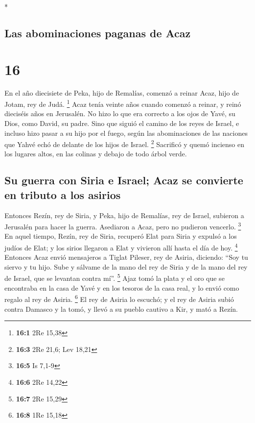 \begin{paracol}{2}
\begin{otherlanguage}{english}
\end{otherlanguage}

\switchcolumn[0]*

\hypertarget{las-abominaciones-paganas-de-acaz}{%
\subsection{Las abominaciones paganas de
Acaz}\label{las-abominaciones-paganas-de-acaz}}

\hypertarget{section-30}{%
\section{16}\label{section-30}}

 En el año diecisiete de Peka, hijo de Remalías, comenzó a
reinar Acaz, hijo de Jotam, rey de Judá. \footnote{\textbf{16:1} 2Re
  15,38}  Acaz tenía veinte años cuando comenzó a reinar,
y reinó dieciséis años en Jerusalén. No hizo lo que era correcto a los
ojos de Yavé, su Dios, como David, su padre.  Sino que
siguió el camino de los reyes de Israel, e incluso hizo pasar a su hijo
por el fuego, según las abominaciones de las naciones que Yahvé echó de
delante de los hijos de Israel. \footnote{\textbf{16:3} 2Re 21,6; Lev
  18,21}  Sacrificó y quemó incienso en los lugares altos,
en las colinas y debajo de todo árbol verde.

\hypertarget{su-guerra-con-siria-e-israel-acaz-se-convierte-en-tributo-a-los-asirios}{%
\subsection{Su guerra con Siria e Israel; Acaz se convierte en tributo a
los
asirios}\label{su-guerra-con-siria-e-israel-acaz-se-convierte-en-tributo-a-los-asirios}}

 Entonces Rezín, rey de Siria, y Peka, hijo de Remalías,
rey de Israel, subieron a Jerusalén para hacer la guerra. Asediaron a
Acaz, pero no pudieron vencerlo. \footnote{\textbf{16:5} Is 7,1-9}
 En aquel tiempo, Rezín, rey de Siria, recuperó Elat para
Siria y expulsó a los judíos de Elat; y los sirios llegaron a Elat y
vivieron allí hasta el día de hoy. \footnote{\textbf{16:6} 2Re 14,22}
 Entonces Acaz envió mensajeros a Tiglat Pileser, rey de
Asiria, diciendo: ``Soy tu siervo y tu hijo. Sube y sálvame de la mano
del rey de Siria y de la mano del rey de Israel, que se levantan contra
mí''. \footnote{\textbf{16:7} 2Re 15,29}  Ajaz tomó la
plata y el oro que se encontraba en la casa de Yavé y en los tesoros de
la casa real, y lo envió como regalo al rey de Asiria. \footnote{\textbf{16:8}
  1Re 15,18}  El rey de Asiria lo escuchó; y el rey de
Asiria subió contra Damasco y la tomó, y llevó a su pueblo cautivo a
Kir, y mató a Rezín.


\end{paracol}
